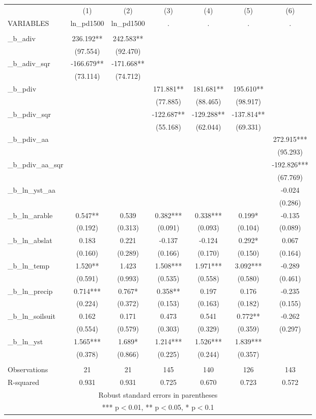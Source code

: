 \documentclass[]{article}
\begin{document}
\begin{tabular}{lcccccc} \hline
 & (1) & (2) & (3) & (4) & (5) & (6) \\
VARIABLES & ln\_pd1500 & ln\_pd1500 & . & . & . & . \\ \hline
 &  &  &  &  &  &  \\
\_b\_adiv & 236.192** & 242.583** &  &  &  &  \\
 & (97.554) & (92.470) &  &  &  &  \\
\_b\_adiv\_sqr & -166.679** & -171.668** &  &  &  &  \\
 & (73.114) & (74.712) &  &  &  &  \\
\_b\_pdiv &  &  & 171.881** & 181.681** & 195.610** &  \\
 &  &  & (77.885) & (88.465) & (98.917) &  \\
\_b\_pdiv\_sqr &  &  & -122.687** & -129.288** & -137.814** &  \\
 &  &  & (55.168) & (62.044) & (69.331) &  \\
\_b\_pdiv\_aa &  &  &  &  &  & 272.915*** \\
 &  &  &  &  &  & (95.293) \\
\_b\_pdiv\_aa\_sqr &  &  &  &  &  & -192.826*** \\
 &  &  &  &  &  & (67.769) \\
\_b\_ln\_yst\_aa &  &  &  &  &  & -0.024 \\
 &  &  &  &  &  & (0.286) \\
\_b\_ln\_arable & 0.547** & 0.539 & 0.382*** & 0.338*** & 0.199* & -0.135 \\
 & (0.192) & (0.313) & (0.091) & (0.093) & (0.104) & (0.089) \\
\_b\_ln\_abslat & 0.183 & 0.221 & -0.137 & -0.124 & 0.292* & 0.067 \\
 & (0.160) & (0.289) & (0.166) & (0.170) & (0.150) & (0.164) \\
\_b\_ln\_temp & 1.520** & 1.423 & 1.508*** & 1.971*** & 3.092*** & -0.289 \\
 & (0.591) & (0.993) & (0.535) & (0.558) & (0.580) & (0.461) \\
\_b\_ln\_precip & 0.714*** & 0.767* & 0.358** & 0.197 & 0.176 & -0.235 \\
 & (0.224) & (0.372) & (0.153) & (0.163) & (0.182) & (0.155) \\
\_b\_ln\_soilsuit & 0.162 & 0.171 & 0.473 & 0.541 & 0.772** & -0.262 \\
 & (0.554) & (0.579) & (0.303) & (0.329) & (0.359) & (0.297) \\
\_b\_ln\_yst & 1.565*** & 1.689* & 1.214*** & 1.526*** & 1.839*** &  \\
 & (0.378) & (0.866) & (0.225) & (0.244) & (0.357) &  \\
 &  &  &  &  &  &  \\
Observations & 21 & 21 & 145 & 140 & 126 & 143 \\
 R-squared & 0.931 & 0.931 & 0.725 & 0.670 & 0.723 & 0.572 \\ \hline
\multicolumn{7}{c}{ Robust standard errors in parentheses} \\
\multicolumn{7}{c}{ *** p$<$0.01, ** p$<$0.05, * p$<$0.1} \\
\end{tabular}
\end{document}
